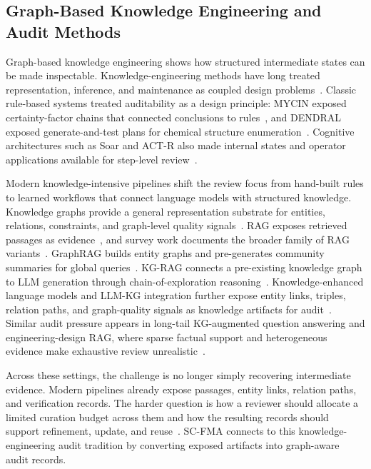 \documentclass[a4paper,fleqn]{cas-sc}
\begin{document}
\subsection{Graph-Based Knowledge Engineering and Audit Methods}

Graph-based knowledge engineering shows how structured intermediate states can be made inspectable. Knowledge-engineering methods have long treated representation, inference, and maintenance as coupled design problems~\cite{studer1998knowledge}. Classic rule-based systems treated auditability as a design principle: MYCIN exposed certainty-factor chains that connected conclusions to rules~\cite{buchanan1984mycin}, and DENDRAL exposed generate-and-test plans for chemical structure enumeration~\cite{lindsay1980dendral}. Cognitive architectures such as Soar and ACT-R also made internal states and operator applications available for step-level review~\cite{laird2012soar,anderson2004actr}.

Modern knowledge-intensive pipelines shift the review focus from hand-built rules to learned workflows that connect language models with structured knowledge. Knowledge graphs provide a general representation substrate for entities, relations, constraints, and graph-level quality signals~\cite{hogan2021knowledge}. RAG exposes retrieved passages as evidence~\cite{lewis2020rag}, and survey work documents the broader family of RAG variants~\cite{gao2023ragsurvey}. GraphRAG builds entity graphs and pre-generates community summaries for global queries~\cite{edge2024graphrag}. KG-RAG connects a pre-existing knowledge graph to LLM generation through chain-of-exploration reasoning~\cite{sanmartin2024kgrag}. Knowledge-enhanced language models and LLM-KG integration further expose entity links, triples, relation paths, and graph-quality signals as knowledge artifacts for audit~\cite{hu2024knowledgeenhanced,pan2024unifying,yang2025kbllmsurvey,chen2025kgquality,dai2025llmkg}. Similar audit pressure appears in long-tail KG-augmented question answering and engineering-design RAG, where sparse factual support and heterogeneous evidence make exhaustive review unrealistic~\cite{huang2025prompting,siddharth2024retrieval,liu2025knowledgereasoning}.

Across these settings, the challenge is no longer simply recovering intermediate evidence. Modern pipelines already expose passages, entity links, relation paths, and verification records. The harder question is how a reviewer should allocate a limited curation budget across them and how the resulting records should support refinement, update, and reuse~\cite{paulheim2017knowledge,higgins2008dcc}. SC-FMA connects to this knowledge-engineering audit tradition by converting exposed artifacts into graph-aware audit records.
\end{document}
